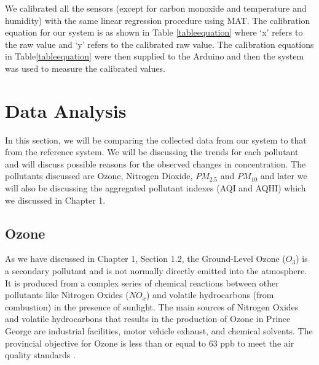  We calibrated all the sensors (except for carbon monoxide and temperature and humidity) with the same linear regression procedure using MAT. 
 The calibration equation for our system is as shown in Table \ref{tableequation} where {\lq x\rq} refers to the raw value and {\lq y\rq }  refers to the calibrated raw value. The calibration equations in Table\ref{tableequation} were then supplied to the Arduino and then the system was used to measure the calibrated values.%







   
   \section{Data Analysis}
  
  In this section, we will be comparing the collected data from our system to that from the reference system. We will be discussing the trends for each pollutant and will discuss possible reasons for the observed changes in concentration. The pollutants discussed are Ozone, Nitrogen Dioxide, $PM_{2.5}$ and $PM_{10}$ and later we will also be discussing the aggregated pollutant indexes (AQI and AQHI) which we discussed in Chapter 1.
  
  
  
  \subsection{Ozone}
As we have discussed in Chapter 1, Section 1.2,  the Ground-Level Ozone ($O_3$) is a secondary pollutant and is not normally directly emitted into the atmosphere. It is produced from a complex series of chemical reactions between other pollutants like Nitrogen Oxides (${NO_x}$) and volatile hydrocarbons (from combustion) in the presence of sunlight\cite{Environment2016}. The main sources of Nitrogen Oxides and volatile hydrocarbons that results in the production of Ozone in Prince George are industrial facilities, motor vehicle exhaust, and chemical solvents. The provincial objective for Ozone is less than or equal to 63 ppb to meet the air quality standards \cite{Environment2016}. 



